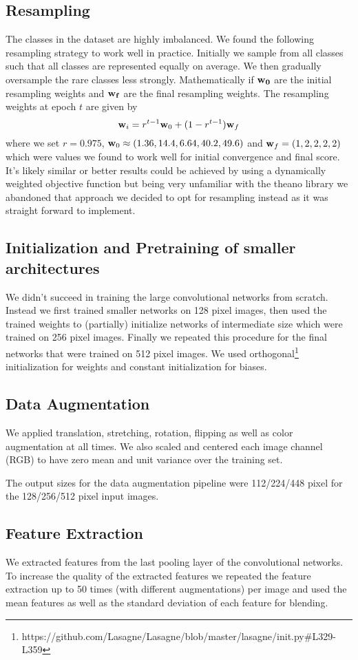 \documentclass[12pt,a4paper]{scrartcl}
\begin{document}
\subsection{Resampling}
The classes in the dataset are highly imbalanced. We found the following resampling strategy to work well in practice. Initially we sample from all classes such that all classes are represented equally on average. We then gradually oversample the rare classes less strongly. Mathematically if ${\bf w_0}$ are the initial resampling weights and ${\bf w_f}$ are the final resampling weights. The resampling weights at epoch $t$ are given by
\begin{equation}
{\bf w}_i = r^{t-1} {\bf w}_0 + (1 - r^{t-1}) {\bf w}_f
\end{equation}
where we set $r=0.975$, ${\bf w}_0 \approx (1.36, 14.4, 6.64, 40.2, 49.6)$ and ${\bf w}_f = (1, 2, 2, 2, 2)$ which were values we found to work well for initial convergence and final score. It's likely similar or better results could be achieved by using a dynamically weighted objective function but being very unfamiliar with the theano library we abandoned that approach we decided to opt for resampling instead as it was straight forward to implement.
\subsection{Initialization and Pretraining of smaller architectures}
We didn't succeed in training the large convolutional networks from scratch. Instead we first trained smaller networks on 128 pixel images, then used the trained weights to (partially) initialize networks of intermediate size which were trained on 256 pixel images. Finally we repeated this procedure for the final networks that were trained on 512 pixel images. We used orthogonal\footnote{https://github.com/Lasagne/Lasagne/blob/master/lasagne/init.py\#L329-L359} initialization for weights and constant initialization for biases.
\subsection{Data Augmentation}
We applied translation, stretching, rotation, flipping as well as color augmentation at all times. We also scaled and centered each image channel (RGB) to have zero mean and unit variance over the training set.

The output sizes for the data augmentation pipeline were 112/224/448 pixel for the 128/256/512 pixel input images. 
\subsection{Feature Extraction}
We extracted features from the last pooling layer of the convolutional networks. To increase the quality of the extracted features we repeated the feature extraction up to 50 times (with different augmentations) per image and used the mean features as well as the standard deviation of each feature for blending.
\end{document}
